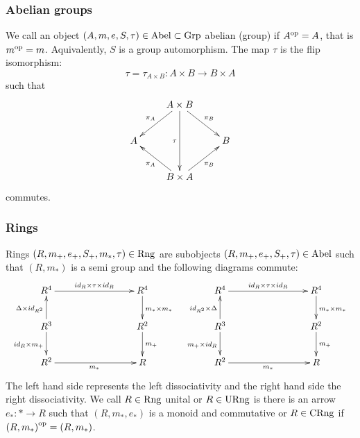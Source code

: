 \subsubsection{Abelian groups} We call an object $(A,m,e,S,\tau) \in \rm{Abel} \subset \rm{Grp}$ abelian (group) if ${A}^{\rm{op}} = A$, that is ${m}^{\rm{op}} = m$. Aquivalently, $S$ is a group automorphism. The map $\tau$ is the flip isomorphism:
$$\tau = \tau_{A\times B}: A \times B \longrightarrow B \times A$$
such that
$$\xymatrix{
&A \times B \ar[ld]_{\pi_A}\ar[rd]^{\pi_B}\ar[dd]_\tau&\\
A & & B\\
&B \times A\ar[lu]^{\pi_A}\ar[ru]_{\pi_B}\\
}$$
commutes.
\subsubsection{Rings} Rings $(R,m_+,e_+,S_+,m_*,\tau) \in \mathrm{Rng}$ are subobjects $(R,m_+,e_+,S_+,\tau) \in \mathrm{Abel}$ such that $(R,m_*)$ is a semi group and the following diagrams commute:
$$\bao{cc}
\xymatrix{
R^4\ar[rrr]^{id_R \times \tau \times id_R}&&&R^4\ar[d]^{m_* \times m_*}\\
R^3\ar[d]_{id_R \times m_+}\ar[u]^{\Delta \times id_{R^2}}&&&R^2\ar[d]^{m_+}\\
R^2 \ar[rrr]_{m_*}&&
&R\\
} & \xymatrix{
R^4\ar[rrr]^{id_R \times \tau \times id_R}&&&R^4\ar[d]^{m_* \times m_*}\\
R^3\ar[d]_{m_+ \times id_R}\ar[u]^{id_{R^2} \times \Delta}&&&R^2\ar[d]^{m_+}\\
R^2 \ar[rrr]_{m_*}&&
&R\\
}
\ea$$
The left hand side represents the left dissociativity and the right hand side the right dissociativity. We call $R \in \mathrm{Rng}$ unital or $R \in \mathrm{URng}$ is there is an arrow $e_* : \ast \longrightarrow R$ such that $(R,m_*,e_*)$ is a monoid and commutative or $R \in \mathrm{CRng}$ if ${(R,m_*)}^{\rm{op}} = (R,m_*)$.
\newcommand{\htalpha}{\hat{\alpha}}
